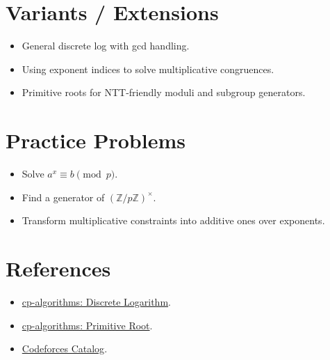 \section*{Variants / Extensions}

\begin{itemize}
  \item General discrete log with gcd handling.
  \item Using exponent indices to solve multiplicative congruences.
  \item Primitive roots for NTT-friendly moduli and subgroup generators.
\end{itemize}

\section*{Practice Problems}

\begin{itemize}
  \item Solve \(a^x \equiv b \pmod p\).
  \item Find a generator of \((\mathbb{Z}/p\mathbb{Z})^\times\).
  \item Transform multiplicative constraints into additive ones over exponents.
\end{itemize}

\section*{References}

\begin{itemize}
  \item \href{https://cp-algorithms.com/algebra/discrete-log.html}{cp-algorithms: Discrete Logarithm}.
  \item \href{https://cp-algorithms.com/algebra/primitive-root.html}{cp-algorithms: Primitive Root}.
  \item \href{https://codeforces.com/catalog}{Codeforces Catalog}.
\end{itemize}
